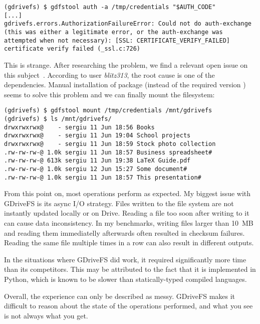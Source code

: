 \begin{lstlisting}[frame=single,caption=GDriveFS authentication error]
(gdrivefs) $ gdfstool auth -a /tmp/credentials "$AUTH_CODE"
[...]
gdrivefs.errors.AuthorizationFailureError: Could not do auth-exchange (this was either a legitimate error, or the auth-exchange was attempted when not necessary): [SSL: CERTIFICATE_VERIFY_FAILED] certificate verify failed (_ssl.c:726)
\end{lstlisting}

This is strange. After researching the problem, we find a relevant open issue on this subject~\cite{gdrivefs_ssl_handshake_error}. According to user \emph{blitz313}, the root cause is one of the dependencies. Manual installation of package  (instead of the required version ) seems to solve this problem and we can finally mount the filesystem:

\begin{lstlisting}[frame=single,caption=GDriveFS filesystem mount]
(gdrivefs) $ gdfstool mount /tmp/credentials /mnt/gdrivefs
(gdrivefs) $ ls /mnt/gdrivefs/
drwxrwxrwx@    - sergiu 11 Jun 18:56 Books
drwxrwxrwx@    - sergiu 11 Jun 19:04 School projects
drwxrwxrwx@    - sergiu 11 Jun 18:59 Stock photo collection
.rw-rw-rw-@ 1.0k sergiu 11 Jun 18:57 Business spreadsheet#
.rw-rw-rw-@ 613k sergiu 11 Jun 19:38 LaTeX Guide.pdf
.rw-rw-rw-@ 1.0k sergiu 12 Jun 15:27 Some document#
.rw-rw-rw-@ 1.0k sergiu 11 Jun 18:57 This presentation#
\end{lstlisting}

From this point on, most operations perform as expected. My biggest issue with GDriveFS is its async I/O strategy. Files written to the file system are not instantly updated locally or on Drive. Reading a file too soon after writing to it can cause data inconsistency. In my benchmarks, writing files larger than \mbox{10 MB} and reading them immediatelly afterwards often resulted in checksum failures. Reading the same file multiple times in a row can also result in different outputs.

In the situations where GDriveFS did work, it required significantly more time than its competitors. This may be attributed to the fact that it is implemented in Python, which is known to be slower than statically-typed compiled languages.

Overall, the experience can only be described as messy. GDriveFS makes it difficult to reason about the state of the operations performed, and what you see is not always what you get.

